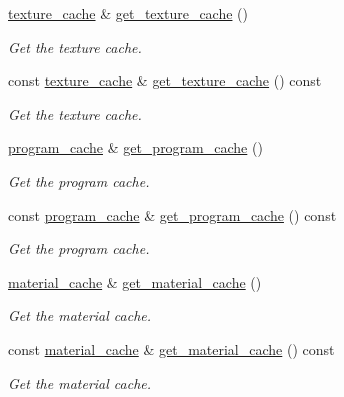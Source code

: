 \begin{DoxyCompactItemize}
\item 
\mbox{\hyperlink{classmoka_1_1texture__cache}{texture\+\_\+cache}} \& \mbox{\hyperlink{classmoka_1_1graphics__device_a11cc5af3339a854119c1e6d4e314535b}{get\+\_\+texture\+\_\+cache}} ()
\begin{DoxyCompactList}\small\item\em Get the texture cache. \end{DoxyCompactList}\item 
const \mbox{\hyperlink{classmoka_1_1texture__cache}{texture\+\_\+cache}} \& \mbox{\hyperlink{classmoka_1_1graphics__device_adb460df9566b5f03d95cbe10ada931cf}{get\+\_\+texture\+\_\+cache}} () const
\begin{DoxyCompactList}\small\item\em Get the texture cache. \end{DoxyCompactList}\item 
\mbox{\hyperlink{classmoka_1_1program__cache}{program\+\_\+cache}} \& \mbox{\hyperlink{classmoka_1_1graphics__device_af4b5a98ad455812b96fe7cd3d638b81d}{get\+\_\+program\+\_\+cache}} ()
\begin{DoxyCompactList}\small\item\em Get the program cache. \end{DoxyCompactList}\item 
const \mbox{\hyperlink{classmoka_1_1program__cache}{program\+\_\+cache}} \& \mbox{\hyperlink{classmoka_1_1graphics__device_ac75770427381cfe146dcf1244a461b27}{get\+\_\+program\+\_\+cache}} () const
\begin{DoxyCompactList}\small\item\em Get the program cache. \end{DoxyCompactList}\item 
\mbox{\hyperlink{classmoka_1_1material__cache}{material\+\_\+cache}} \& \mbox{\hyperlink{classmoka_1_1graphics__device_a89fa05e0146e2f4ec171c48321c27fe2}{get\+\_\+material\+\_\+cache}} ()
\begin{DoxyCompactList}\small\item\em Get the material cache. \end{DoxyCompactList}\item 
const \mbox{\hyperlink{classmoka_1_1material__cache}{material\+\_\+cache}} \& \mbox{\hyperlink{classmoka_1_1graphics__device_ab40f1a8e7fcb32ffb04d79dc0d9167c8}{get\+\_\+material\+\_\+cache}} () const
\begin{DoxyCompactList}\small\item\em Get the material cache. \end{DoxyCompactList}\item 

\end{DoxyCompactItemize}
